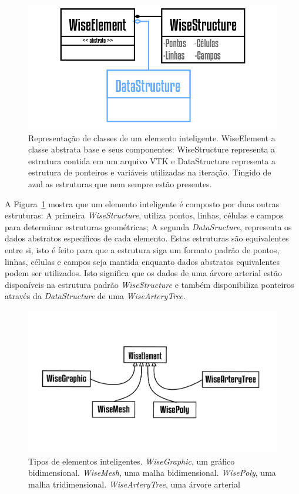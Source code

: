 \documentclass[
        english,			
        brazil			        %
        ,<...>]{abntbibufjf}
\begin{document}
\begin{figure}[!htbp]
	\centering
	\includegraphics[scale=1]{Figures/WiseElement.png}
	\caption{Representação de classes de um elemento inteligente. WiseElement a classe abstrata base e seus componentes: WiseStructure representa a estrutura contida em um arquivo VTK e DataStructure representa a estrutura de ponteiros e variáveis utilizadas na iteração. Tingido de azul as estruturas que nem sempre estão presentes.}
	\label{fig2:wiselement}
\end{figure}

A Figura~\ref{fig2:wiselement} mostra que um elemento inteligente é composto por duas outras estruturas: A primeira \textit{WiseStructure}, utiliza pontos, linhas, células e campos para determinar estruturas geométricas; A segunda \textit{DataSructure}, representa os dados abstratos específicos de cada elemento. Estas estruturas são equivalentes entre si, isto é feito para que a estrutura siga um formato padrão de pontos, linhas, células e campos seja mantida enquanto dados abstratos equivalentes podem ser utilizados. Isto significa que os dados de uma árvore arterial estão disponíveis na estrutura padrão \textit{WiseStructure} e também disponibiliza ponteiros através da \textit{DataStructure} de uma \textit{WiseArteryTree}.

\begin{figure}[!htbp]
	\centering
	\includegraphics[scale=1]{Figures/WiseElements.png}
	\caption{Tipos de elementos inteligentes. \textit{WiseGraphic}, um gráfico bidimensional. \textit{WiseMesh}, uma malha bidimensional. \textit{WisePoly}, uma malha tridimensional. \textit{WiseArteryTree}, uma árvore arterial}
	\label{fig2:wiselements}
\end{figure}
\end{document}
